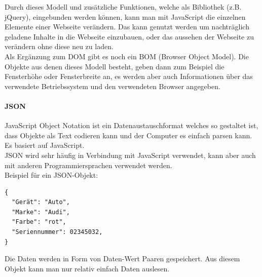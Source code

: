 Durch dieses Modell und zusätzliche Funktionen, welche als Bibliothek (z.B. jQuery), eingebunden werden können, kann man mit JavaScript die einzelnen Elemente einer Webseite verändern. Das kann genutzt werden um nachträglich geladene Inhalte in die Webseite einzubauen, oder das aussehen der Webseite zu verändern ohne diese neu zu laden.\\
Als Ergänzung zum DOM gibt es noch ein BOM (Browser Object Model). Die Objekte aus denen dieses Modell besteht, geben dann zum Beispiel die Fensterhöhe oder Fensterbreite an, es werden aber auch Informationen über das verwendete Betriebssystem und den verwendeten Browser angegeben.

\paragraph{JSON}
JavaScript Object Notation ist ein Datenaustauschformat welches so gestaltet ist, dass Objekte als Text codieren kann und der Computer es einfach parsen kann. Es basiert auf JavaScript.\\
JSON wird sehr häufig in Verbindung mit JavaScript verwendet, kann aber auch mit anderen Programmiersprachen verwendet werden.\\
Beispiel für ein JSON-Objekt:\\
\begin{lstlisting}[language=html]
{
  "Gerät": "Auto",
  "Marke": "Audi",
  "Farbe": "rot",
  "Seriennummer": 02345032,
}
\end{lstlisting}
Die Daten werden in Form von Daten-Wert Paaren gespeichert. Aus diesem Objekt kann man nur relativ einfach Daten auslesen.\\ 




